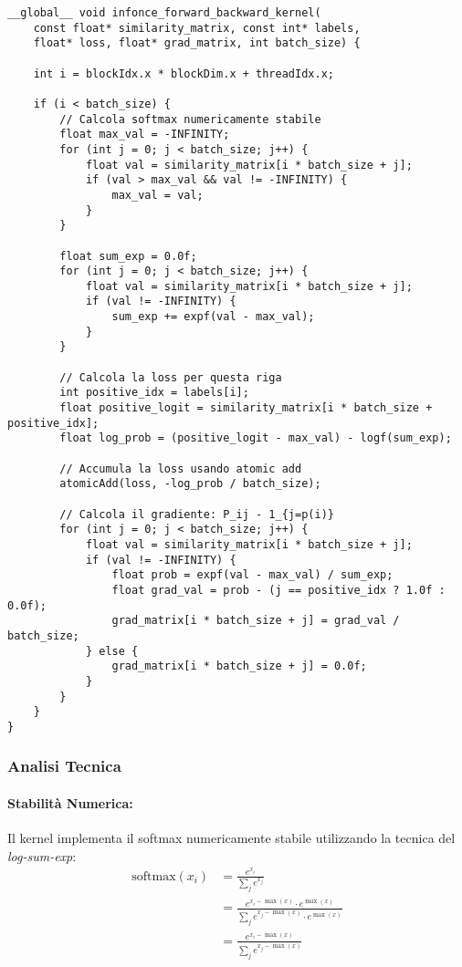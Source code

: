\documentclass[a4paper,11pt]{article}
\begin{document}
\begin{lstlisting}[caption={Kernel per calcolo loss e gradienti}]
__global__ void infonce_forward_backward_kernel(
    const float* similarity_matrix, const int* labels,
    float* loss, float* grad_matrix, int batch_size) {
    
    int i = blockIdx.x * blockDim.x + threadIdx.x;
    
    if (i < batch_size) {
        // Calcola softmax numericamente stabile
        float max_val = -INFINITY;
        for (int j = 0; j < batch_size; j++) {
            float val = similarity_matrix[i * batch_size + j];
            if (val > max_val && val != -INFINITY) {
                max_val = val;
            }
        }
        
        float sum_exp = 0.0f;
        for (int j = 0; j < batch_size; j++) {
            float val = similarity_matrix[i * batch_size + j];
            if (val != -INFINITY) {
                sum_exp += expf(val - max_val);
            }
        }
        
        // Calcola la loss per questa riga
        int positive_idx = labels[i];
        float positive_logit = similarity_matrix[i * batch_size + positive_idx];
        float log_prob = (positive_logit - max_val) - logf(sum_exp);
        
        // Accumula la loss usando atomic add
        atomicAdd(loss, -log_prob / batch_size);
        
        // Calcola il gradiente: P_ij - 1_{j=p(i)}
        for (int j = 0; j < batch_size; j++) {
            float val = similarity_matrix[i * batch_size + j];
            if (val != -INFINITY) {
                float prob = expf(val - max_val) / sum_exp;
                float grad_val = prob - (j == positive_idx ? 1.0f : 0.0f);
                grad_matrix[i * batch_size + j] = grad_val / batch_size;
            } else {
                grad_matrix[i * batch_size + j] = 0.0f;
            }
        }
    }
}
\end{lstlisting}

\subsubsection{Analisi Tecnica}

\paragraph{Stabilità Numerica:}
Il kernel implementa il softmax numericamente stabile utilizzando la tecnica del \emph{log-sum-exp}:
\begin{align}
\text{softmax}(x_i) &= \frac{e^{x_i}}{\sum_j e^{x_j}} \\
&= \frac{e^{x_i - \max(x)} \cdot e^{\max(x)}}{\sum_j e^{x_j - \max(x)} \cdot e^{\max(x)}} \\
&= \frac{e^{x_i - \max(x)}}{\sum_j e^{x_j - \max(x)}}
\end{align}
\end{document}
